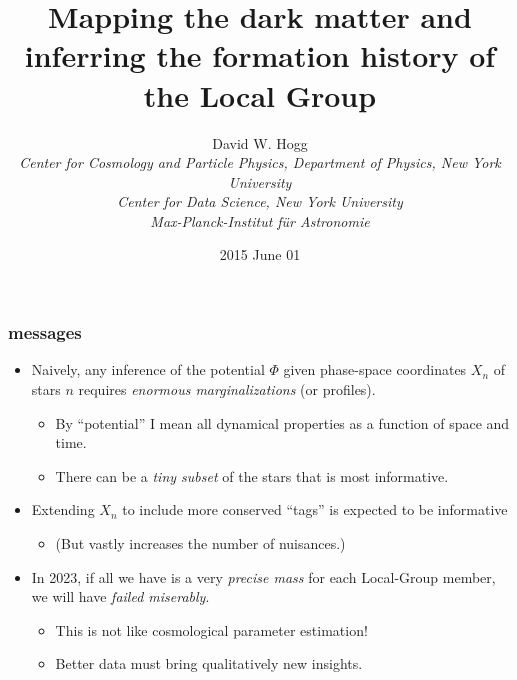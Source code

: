 \documentclass[pdftex]{beamer}
\title{Mapping the dark matter and inferring the formation history of the Local Group}
\author[David W. Hogg (NYU)]{David W. Hogg \\
  \textsl{\footnotesize Center for Cosmology and Particle Physics, Department of Physics,
                 New York University}\\
  \textsl{\footnotesize Center for Data Science,
                 New York University}\\
  \textsl{\footnotesize Max-Planck-Institut f\"ur Astronomie}}
\date{2015 June 01}
\begin{document}
\begin{frame}
  \titlepage
\end{frame}

\newcommand{\messages}{%
\begin{frame}
  \frametitle{messages}
  \begin{itemize}
  \item Naively, any inference of the potential $\Phi$ given
    phase-space coordinates $X_n$ of stars $n$ requires \emph{enormous
      marginalizations} (or profiles).
    \begin{itemize}
    \item By ``potential'' I mean all dynamical properties as a function of space and time.
    \item There can be a \emph{tiny subset} of the stars that is most informative.
    \end{itemize}
  \item Extending $X_n$ to include more conserved ``tags'' is expected to be informative
    \begin{itemize}
    \item (But vastly increases the number of nuisances.)
    \end{itemize}
  \item In 2023, if all we have is a very \emph{precise mass} for
    each Local-Group member, we will have \emph{failed miserably}.
    \begin{itemize}
    \item This is not like cosmological parameter estimation!
    \item Better data must bring qualitatively new insights.
    \end{itemize}
  \end{itemize}
\end{frame}}

\messages
\end{document}
